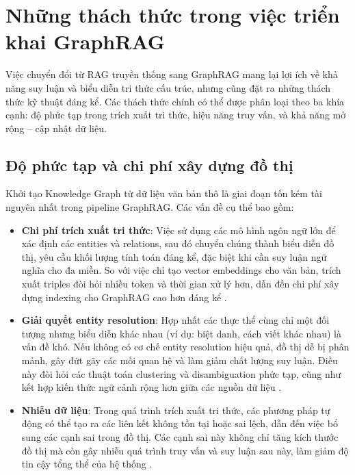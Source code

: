 \section{Những thách thức trong việc triển khai GraphRAG}

Việc chuyển đổi từ RAG truyền thống sang GraphRAG mang lại lợi ích về khả năng suy luận và biểu diễn tri thức cấu trúc, nhưng cũng đặt ra những thách thức kỹ thuật đáng kể. Các thách thức chính có thể được phân loại theo ba khía cạnh: độ phức tạp trong trích xuất tri thức, hiệu năng truy vấn, và khả năng mở rộng – cập nhật dữ liệu.

\subsection{Độ phức tạp và chi phí xây dựng đồ thị}
Khởi tạo Knowledge Graph từ dữ liệu văn bản thô là giai đoạn tốn kém tài nguyên nhất trong pipeline GraphRAG. Các vấn đề cụ thể bao gồm:

\begin{itemize}
    \item \textbf{Chi phí trích xuất tri thức}: Việc sử dụng các mô hình ngôn ngữ lớn để xác định các entities và relations, sau đó chuyển chúng thành biểu diễn đồ thị, yêu cầu khối lượng tính toán đáng kể, đặc biệt khi cần suy luận ngữ nghĩa cho đa miền. So với việc chỉ tạo vector embeddings cho văn bản, trích xuất triples đòi hỏi nhiều token và thời gian xử lý hơn, dẫn đến chi phí xây dựng indexing cho GraphRAG cao hơn đáng kể \cite{pan2024unifying, edge2024global}.
    
    \item \textbf{Giải quyết entity resolution}: Hợp nhất các thực thể cùng chỉ một đối tượng nhưng biểu diễn khác nhau (ví dụ: biệt danh, cách viết khác nhau) là vấn đề khó. Nếu không có cơ chế entity resolution hiệu quả, đồ thị dễ bị phân mảnh, gây đứt gãy các mối quan hệ và làm giảm chất lượng suy luận. Điều này đòi hỏi các thuật toán clustering và disambiguation phức tạp, cũng như kết hợp kiến thức ngữ cảnh rộng hơn giữa các nguồn dữ liệu \cite{pan2024unifying}.
    
    \item \textbf{Nhiễu dữ liệu}: Trong quá trình trích xuất tri thức, các phương pháp tự động có thể tạo ra các liên kết không tồn tại hoặc sai lệch, dẫn đến việc bổ sung các cạnh sai trong đồ thị. Các cạnh sai này không chỉ tăng kích thước đồ thị mà còn gây nhiễu quá trình truy vấn và suy luận sau này, làm giảm độ tin cậy tổng thể của hệ thống \cite{pan2024unifying, luo2024reasoning}.
\end{itemize}

